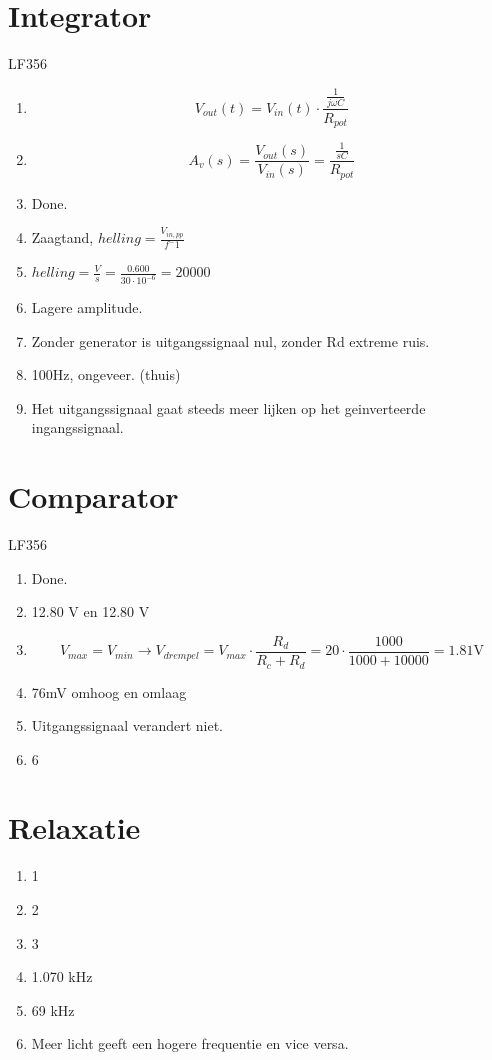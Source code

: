 \documentclass{report}
\begin{document}
\section{Integrator}
LF356
\begin{enumerate}
\item \begin{equation}
V_{out}(t) = V_{in}(t)\cdot \frac{\frac{1}{j\omega C}}{R_{pot}}
\end{equation}
\item \begin{equation}
A_v(s)=\frac{V_{out}(s)}{V_{in}(s)} = \frac{\frac{1}{sC}}{R_{pot}}
\end{equation}
\item Done.
\item Zaagtand, $helling=\frac{V_{in,pp}}{f^-1}$
\item $helling=\frac{V}{s}=\frac{0.600}{30\cdot10^{-6}}=20000$
\item Lagere amplitude.
\item Zonder generator is uitgangssignaal nul, zonder Rd extreme ruis.
\item 100Hz, ongeveer. (thuis)
\item Het uitgangssignaal gaat steeds meer lijken op het geinverteerde ingangssignaal.
\end{enumerate}
\section{Comparator}
LF356
\begin{enumerate}
\item Done.
\item 12.80 V en 12.80 V
\item \begin{equation}
V_{max}=V_{min} \to V_{drempel} = V_{max}\cdot\frac{R_d}{R_c+R_d}=20\cdot\frac{1000}{1000+10000}=1.81\mathrm{V}
\end{equation}
\item 76mV omhoog en omlaag
\item Uitgangssignaal verandert niet.
\item 6
\end{enumerate}
\section{Relaxatie}
\begin{enumerate}
\item 1
\item 2
\item 3
\item 1.070 kHz
\item 69 kHz
\item Meer licht geeft een hogere frequentie en vice versa.
\end{enumerate}
\end{document}
